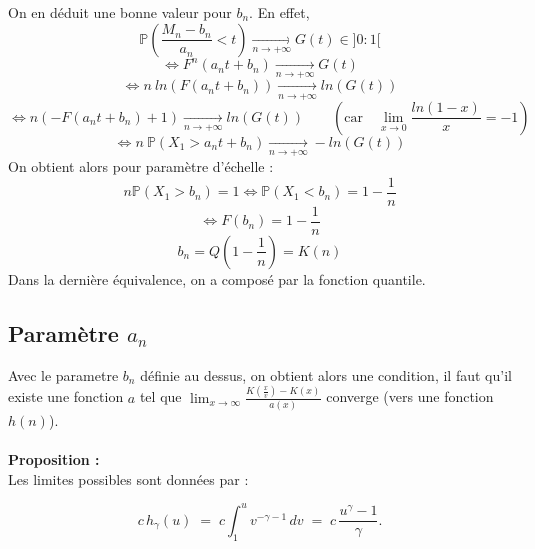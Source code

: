 \documentclass{article}
\begin{document}
On en déduit une bonne valeur pour $b_n$. En effet,
\[
\mathbb{P} \left( \frac{M_n - b_n}{a_n} < t \right) \xrightarrow[n\to +\infty]{} G(t) \in ]0:1[
\]
\[
\Longleftrightarrow F^n(a_n t + b_n) \xrightarrow[n\to +\infty]{} G(t)
\]
\[
\Longleftrightarrow n \: ln(F(a_n t + b_n)) \xrightarrow[n\to +\infty]{} ln(G(t))
\]
\[
\Longleftrightarrow n(- F(a_n t + b_n) + 1) \xrightarrow[n\to +\infty]{} ln(G(t)) \quad \quad (\text{car} \quad \lim_{x \to 0} \frac{ln(1-x)}{x} = -1)
\]
\[
\Longleftrightarrow n \: \mathbb{P}(X_1 > a_n t + b_n ) \xrightarrow[n\to +\infty]{} - ln(G(t))
\]
On obtient alors pour paramètre d'échelle :
\[
n \mathbb{P}(X_1 > b_n) =1  \Longleftrightarrow \mathbb{P}(X_1 < b_n) = 1 - \frac{1}{n}
\]
\[
\Longleftrightarrow F(b_n) = 1 - \frac{1}{n}
\]
\[
b_n = Q(1-\frac{1}{n}) = K(n)
\]
Dans la dernière équivalence, on a composé par la fonction quantile.
\\
\subsection{Paramètre $a_n$}
Avec le parametre $b_n$ définie au dessus, on obtient alors une condition, il faut qu'il existe une fonction $a$ tel que $\lim_{x \to \infty} \frac{K(\frac{x}{v}) - K(x)}{a(x)}$ converge (vers une fonction $h(n)$).
\\
\\
\textbf{Proposition :}
\\
Les limites possibles sont données par :

\begin{equation}\label{eq:1.2}
    c\,h_{\gamma}(u) 
    \;=\; 
    c \int_{1}^{u} v^{-\gamma - 1}\,dv 
    \;=\; 
    c\,\frac{u^{\gamma} - 1}{\gamma}.
\end{equation}
\end{document}
